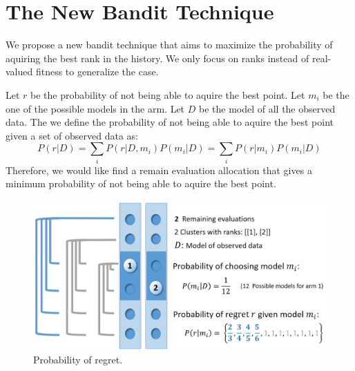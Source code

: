 \section{The New Bandit Technique}

We propose a new bandit technique that aims to maximize the probability of aquiring the best rank in the history.
We only focus on ranks instead of real-valued fitness to generalize the case.

Let $r$ be the probability of not being able to aquire the best point.
Let $m_i$ be the one of the possible models in the arm.
Let $D$ be the model of all the observed data.
The we define the probability of not being able to aquire the best point given a set of observed data as:
\begin{equation}
P(r|D) = \sum_{i} P(r|D, m_i)P(m_i|D) = \sum_{i}P(r|m_i)P(m_i|D) 
\end{equation}\label{equation:bandit}
Therefore, we would like find a remain evaluation allocation that gives a minimum probability of not being able to aquire the best point.

\begin{figure}
\centering
\includegraphics[width=\textwidth]{Bandit_arm}
\caption{Probability of regret.}\label{fig:Bandit_arm}
\end{figure} 

